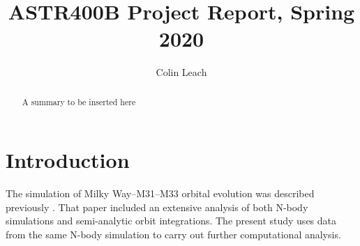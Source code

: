 \documentclass{aastex63}
\begin{document}
	
\title{ASTR400B Project Report, Spring 2020}

\author[0000-0003-3608-1546]{Colin Leach}

\begin{abstract}
	
A summary to be inserted here

\end{abstract}

\section{Introduction}

The simulation of Milky Way--M31--M33 orbital evolution was described previously \citep{marel_m31_2012}. That paper included an extensive analysis of both N-body simulations and semi-analytic orbit integrations. The present study uses data from the same N-body simulation to carry out further computational analysis.


\citep{toomre_galactic_1972}


{}

\end{document}
